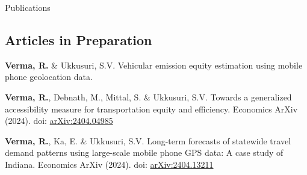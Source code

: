 \documentclass{CV} %
\begin{document}
\begin{rSection}{Publications}
    \subsection*{Articles in Preparation}
    \begin{etaremune}
        \item \textbf{Verma, R.} \& Ukkusuri, S.V. Vehicular emission equity estimation using mobile phone geolocation data.
        
        \item \textbf{Verma, R.}, Debnath, M., Mittal, S. \& Ukkusuri, S.V. Towards a generalized accessibility measure for transportation equity and efficiency. Economics ArXiv (2024). doi: \href{https://arxiv.org/abs/2404.04985}{arXiv:2404.04985}
    
        \item \textbf{Verma, R.}, Ka, E. \& Ukkusuri, S.V. Long-term forecasts of statewide travel demand patterns using large-scale mobile phone GPS data: A case study of Indiana. Economics ArXiv (2024). doi: \href{https://arxiv.org/abs/2404.13211}{arXiv:2404.13211}
    \end{etaremune}
\end{rSection}
\end{document}
